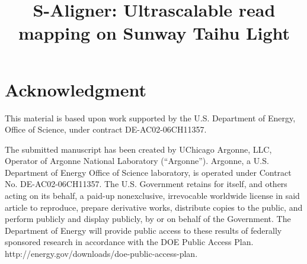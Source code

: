 \documentclass[conference]{IEEEtran}
\begin{document}
\title{S-Aligner: Ultrascalable read mapping on Sunway Taihu Light}

\author{
\and
{}
\and
{}
\and
{}
}

\maketitle



\IEEEpeerreviewmaketitle







\section*{Acknowledgment}
This material is based upon work supported by the U.S. Department of
Energy, Office of Science, under contract DE-AC02-06CH11357.




\vspace{20pt} \footnotesize{The submitted manuscript has been created
  by UChicago Argonne, LLC, Operator of Argonne National Laboratory
  (``Argonne'').  Argonne, a U.S. Department of Energy Office of
  Science laboratory, is operated under Contract
  No. DE-AC02-06CH11357. The U.S. Government retains for itself, and
  others acting on its behalf, a paid-up nonexclusive, irrevocable
  worldwide license in said article to reproduce, prepare derivative
  works, distribute copies to the public, and perform publicly and
  display publicly, by or on behalf of the Government.  The Department
  of Energy will provide public access to these results of federally
  sponsored research in accordance with the DOE Public Access
  Plan. http://energy.gov/downloads/doe-public-access-plan.}
\end{document}
